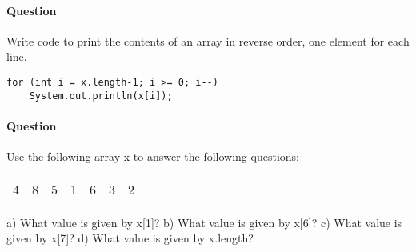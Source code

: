 \documentclass{article}
\begin{document}
\addtocounter{question_num}{1}
\paragraph{Question }
Write code to print the contents of an array in reverse order, one element for each line.
\begin{lstlisting}
for (int i = x.length-1; i >= 0; i--)
	System.out.println(x[i]);
\end{lstlisting}

\addtocounter{question_num}{1}
\paragraph{Question }
Use the following array x to answer the following questions:
\begin{table}[h]
\begin{tabular}{lllllll}
4 & 8 & 5 & 1 & 6 & 3 & 2
\end{tabular}
\end{table}
\newline
a) What value is given by x[1]?
\newline b) What value is given by x[6]?
\newline c) What value is given by x[7]?
\newline d) What value is given by x.length?
\end{document}
